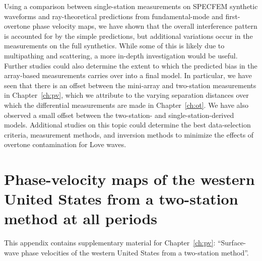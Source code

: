 \documentclass[12pt,oneside]{book}
\begin{document}
Using a comparison between single-station measurements on SPECFEM synthetic waveforms and ray-theoretical predictions from fundamental-mode and first-overtone phase velocity maps, we have shown that the overall interference pattern is accounted for by the simple predictions, but additional variations occur in the measurements on the full synthetics. While some of this is likely due to multipathing and scattering, a more in-depth investigation would be useful. Further studies could also determine the extent to which the predicted bias in the array-based measurements carries over into a final model. In particular, we have seen that there is an offset between the mini-array and two-station measurements in Chapter~\ref{ch:pv}, which we attribute to the varying separation distances over which the differential measurements are made in Chapter~\ref{ch:ot}. We have also observed a small offset between the two-station- and single-station-derived models. Additional studies on this topic could determine the best data-selection criteria, measurement methods, and inversion methods to minimize the effects of overtone contamination for Love waves. 
  

\raggedbottom
\pagebreak


\cleardoublepage
\normalsize
\singlespacing


\clearpage

\appendix
{}
\chapter[Phase-velocity maps, all periods]{Phase-velocity maps of the western United States from a two-station method at all periods}
\label{appendixA}
\thispagestyle{fancy}
\doublespacing

\begin{raggedright}
This appendix contains supplementary material for Chapter~\ref{ch:pv}: ``Surface-wave phase velocities of the western United States from a two-station method''. 
\end{raggedright}
\vspace{1cm}
\end{document}
